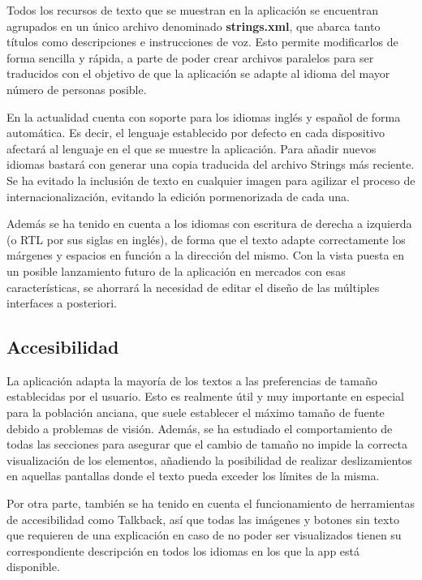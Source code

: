 Todos los recursos de texto que se muestran en la aplicación se encuentran agrupados en un único archivo denominado \textbf{strings.xml}, que abarca tanto títulos como descripciones e instrucciones de voz. Esto permite modificarlos de forma sencilla y rápida, a parte de poder crear archivos paralelos para ser traducidos con el objetivo de que la aplicación se adapte al idioma del mayor número de personas posible.

En la actualidad cuenta con soporte para los idiomas inglés y español de forma automática. Es decir, el lenguaje establecido por defecto en cada dispositivo afectará al lenguaje en el que se muestre la aplicación. Para añadir nuevos idiomas bastará con generar una copia traducida del archivo Strings más reciente. Se ha evitado la inclusión de texto en cualquier imagen para agilizar el proceso de internacionalización, evitando la edición pormenorizada de cada una. 

Además se ha tenido en cuenta a los idiomas con escritura de derecha a izquierda (o RTL por sus siglas en inglés), de forma que el texto adapte correctamente los márgenes y espacios en función a la dirección del mismo. Con la vista puesta en un posible lanzamiento futuro de la aplicación en mercados con esas características, se ahorrará la necesidad de editar el diseño de las múltiples interfaces a posteriori.

\subsection{Accesibilidad}

La aplicación adapta la mayoría de los textos a las preferencias de tamaño establecidas por el usuario. Esto es realmente útil y muy importante en especial para la población anciana, que suele establecer el máximo tamaño de fuente debido a problemas de visión. Además, se ha estudiado el comportamiento de todas las secciones para asegurar que el cambio de tamaño no impide la correcta visualización de los elementos, añadiendo la posibilidad de realizar deslizamientos en aquellas pantallas donde el texto pueda exceder los límites de la misma. 

Por otra parte, también se ha tenido en cuenta el funcionamiento de herramientas de accesibilidad como Talkback, así que todas las imágenes y botones sin texto que requieren de una explicación en caso de no poder ser visualizados tienen su correspondiente descripción en todos los idiomas en los que la app está disponible.

